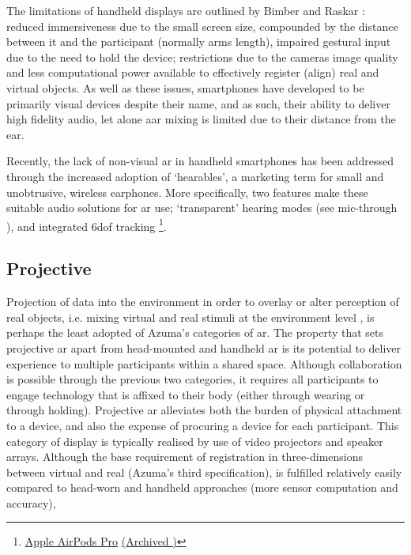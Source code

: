 The limitations of handheld displays are outlined by Bimber and Raskar \citeyearpar[pp. 79-83]{bimber2005}: reduced immersiveness due to the small screen size, compounded by the distance between it and the participant (normally arms length), impaired gestural input due to the need to hold the device; restrictions due to the cameras image quality and less computational power available to effectively register (align) real and virtual objects. As well as these issues, smartphones have developed to be primarily visual devices despite their name, and as such, their ability to deliver high fidelity audio, let alone \gls{aar} mixing is limited due to their distance from the ear. 

Recently, the lack of non-visual \gls{ar} in handheld smartphones has been addressed through the increased adoption of `hearables', a marketing term for small and unobtrusive, wireless earphones. More specifically, two features make these suitable audio solutions for \gls{ar} use; `transparent' hearing modes (see mic-through \citep{lindeman2008}), and integrated \gls{6dof} tracking \footnote{\href{https://www.apple.com/airpods-pro/specs/}{Apple AirPods Pro} \href{https://archive.today/MMtjy}{(Archived \faArchive)}}.

\subsection{Projective}\label{sec: ar-forms-proj}
Projection of data into the environment in order to overlay or alter perception of real objects, i.e. mixing virtual and real stimuli at the environment level \citep{lindeman2007}, is perhaps the least adopted of Azuma's categories of \gls{ar}. The property that sets projective \gls{ar} apart from head-mounted and handheld \gls{ar} is its potential to deliver experience to multiple participants within a shared space. Although collaboration is possible through the previous two categories, it requires all participants to engage technology that is affixed to their body (either through wearing or through holding). Projective \gls{ar} alleviates both the burden of physical attachment to a device, and also the expense of procuring a device for each participant. This category of display is typically realised by use of video projectors and speaker arrays. Although the base requirement of registration in three-dimensions between virtual and real (Azuma's third specification), is fulfilled relatively easily compared to head-worn and handheld approaches (more sensor computation and accuracy), 

